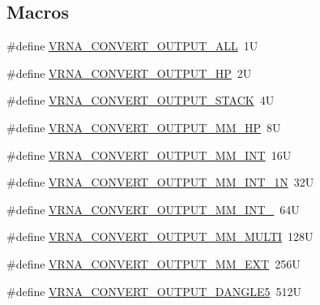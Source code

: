 \subsection*{Macros}
\begin{DoxyCompactItemize}
\item 
\#define \mbox{\hyperlink{group__energy__parameters__convert_ga8dc6aee5a806c49b71557152f9616bc4}{V\+R\+N\+A\+\_\+\+C\+O\+N\+V\+E\+R\+T\+\_\+\+O\+U\+T\+P\+U\+T\+\_\+\+A\+LL}}~1U
\item 
\#define \mbox{\hyperlink{group__energy__parameters__convert_gaf66fe2cb11dfcfd32d791049c254a8a4}{V\+R\+N\+A\+\_\+\+C\+O\+N\+V\+E\+R\+T\+\_\+\+O\+U\+T\+P\+U\+T\+\_\+\+HP}}~2U
\item 
\#define \mbox{\hyperlink{group__energy__parameters__convert_gad23522d63f8d4c50d5a5deee9bee3ef2}{V\+R\+N\+A\+\_\+\+C\+O\+N\+V\+E\+R\+T\+\_\+\+O\+U\+T\+P\+U\+T\+\_\+\+S\+T\+A\+CK}}~4U
\item 
\#define \mbox{\hyperlink{group__energy__parameters__convert_gaa892c7b4957459090f3e08da298cc347}{V\+R\+N\+A\+\_\+\+C\+O\+N\+V\+E\+R\+T\+\_\+\+O\+U\+T\+P\+U\+T\+\_\+\+M\+M\+\_\+\+HP}}~8U
\item 
\#define \mbox{\hyperlink{group__energy__parameters__convert_ga4ff223fb1f9c62cd92d9ab811ad03d55}{V\+R\+N\+A\+\_\+\+C\+O\+N\+V\+E\+R\+T\+\_\+\+O\+U\+T\+P\+U\+T\+\_\+\+M\+M\+\_\+\+I\+NT}}~16U
\item 
\#define \mbox{\hyperlink{group__energy__parameters__convert_gaf5d3743219f83c6348155cd81e755bbb}{V\+R\+N\+A\+\_\+\+C\+O\+N\+V\+E\+R\+T\+\_\+\+O\+U\+T\+P\+U\+T\+\_\+\+M\+M\+\_\+\+I\+N\+T\+\_\+1N}}~32U
\item 
\#define \mbox{\hyperlink{group__energy__parameters__convert_ga78382ec622ba99e0ac2262317bdd7316}{V\+R\+N\+A\+\_\+\+C\+O\+N\+V\+E\+R\+T\+\_\+\+O\+U\+T\+P\+U\+T\+\_\+\+M\+M\+\_\+\+I\+N\+T\+\_}}~64U
\item 
\#define \mbox{\hyperlink{group__energy__parameters__convert_gae67af9f1cdf7baf2865481282a5d1034}{V\+R\+N\+A\+\_\+\+C\+O\+N\+V\+E\+R\+T\+\_\+\+O\+U\+T\+P\+U\+T\+\_\+\+M\+M\+\_\+\+M\+U\+L\+TI}}~128U
\item 
\#define \mbox{\hyperlink{group__energy__parameters__convert_gaf14ead7ef1fdbe725ade653750fc51e3}{V\+R\+N\+A\+\_\+\+C\+O\+N\+V\+E\+R\+T\+\_\+\+O\+U\+T\+P\+U\+T\+\_\+\+M\+M\+\_\+\+E\+XT}}~256U
\item 
\#define \mbox{\hyperlink{group__energy__parameters__convert_ga036ffd996d8c8a9acf631760dd1da24b}{V\+R\+N\+A\+\_\+\+C\+O\+N\+V\+E\+R\+T\+\_\+\+O\+U\+T\+P\+U\+T\+\_\+\+D\+A\+N\+G\+L\+E5}}~512U

\end{DoxyCompactItemize}
